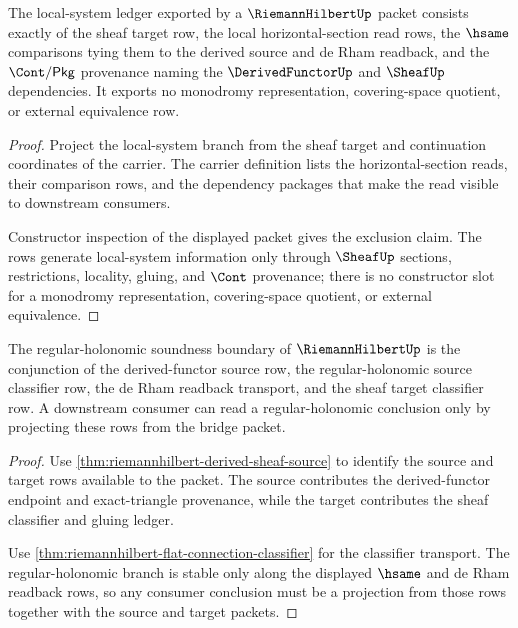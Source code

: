 \begin{theorem}
\label{thm:riemannhilbert-local-system-ledger}
The local-system ledger exported by a $\RiemannHilbertUp$ packet consists exactly of the sheaf target row, the local horizontal-section read rows, the $\hsame$ comparisons tying them to the derived source and de Rham readback, and the $\Cont/\mathsf{Pkg}$ provenance naming the $\DerivedFunctorUp$ and $\SheafUp$ dependencies. It exports no monodromy representation, covering-space quotient, or external equivalence row.
\end{theorem}
\begin{proof}
Project the local-system branch from the sheaf target and continuation coordinates of the carrier. The carrier definition lists the horizontal-section reads, their comparison rows, and the dependency packages that make the read visible to downstream consumers.

Constructor inspection of the displayed packet gives the exclusion claim. The rows generate local-system information only through $\SheafUp$ sections, restrictions, locality, gluing, and $\Cont$ provenance; there is no constructor slot for a monodromy representation, covering-space quotient, or external equivalence.
\end{proof}

\begin{theorem}
\label{thm:riemannhilbert-regular-holonomic-soundness}
The regular-holonomic soundness boundary of $\RiemannHilbertUp$ is the conjunction of the derived-functor source row, the regular-holonomic source classifier row, the de Rham readback transport, and the sheaf target classifier row. A downstream consumer can read a regular-holonomic conclusion only by projecting these rows from the bridge packet.
\end{theorem}
\begin{proof}
Use \autoref{thm:riemannhilbert-derived-sheaf-source} to identify the source and target rows available to the packet. The source contributes the derived-functor endpoint and exact-triangle provenance, while the target contributes the sheaf classifier and gluing ledger.

Use \autoref{thm:riemannhilbert-flat-connection-classifier} for the classifier transport. The regular-holonomic branch is stable only along the displayed $\hsame$ and de Rham readback rows, so any consumer conclusion must be a projection from those rows together with the source and target packets.
\end{proof}

